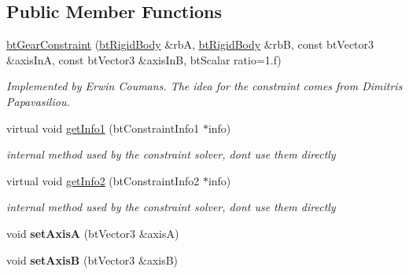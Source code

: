 \subsection*{Public Member Functions}
\begin{DoxyCompactItemize}
\item 
\mbox{\label{classbtGearConstraint_aee33fd1dac22b6f0323757057204e891}} 
\hyperlink{classbtGearConstraint_aee33fd1dac22b6f0323757057204e891}{bt\+Gear\+Constraint} (\hyperlink{classbtRigidBody}{bt\+Rigid\+Body} \&rbA, \hyperlink{classbtRigidBody}{bt\+Rigid\+Body} \&rbB, const bt\+Vector3 \&axis\+InA, const bt\+Vector3 \&axis\+InB, bt\+Scalar ratio=1.f)
\begin{DoxyCompactList}\small\item\em Implemented by Erwin Coumans. The idea for the constraint comes from Dimitris Papavasiliou. \end{DoxyCompactList}\item 
\mbox{\label{classbtGearConstraint_ae8e7d953740bff99eca4441b5d9c7eb1}} 
virtual void \hyperlink{classbtGearConstraint_ae8e7d953740bff99eca4441b5d9c7eb1}{get\+Info1} (bt\+Constraint\+Info1 $\ast$info)
\begin{DoxyCompactList}\small\item\em internal method used by the constraint solver, don\textquotesingle{}t use them directly \end{DoxyCompactList}\item 
\mbox{\label{classbtGearConstraint_ae1c6770b8835458389ca7ae3ce7dfb05}} 
virtual void \hyperlink{classbtGearConstraint_ae1c6770b8835458389ca7ae3ce7dfb05}{get\+Info2} (bt\+Constraint\+Info2 $\ast$info)
\begin{DoxyCompactList}\small\item\em internal method used by the constraint solver, don\textquotesingle{}t use them directly \end{DoxyCompactList}\item 
\mbox{\label{classbtGearConstraint_a7eb82d1854a2ab8982d65af6d2bde007}} 
void {\bfseries set\+AxisA} (bt\+Vector3 \&axisA)
\item 
\mbox{\label{classbtGearConstraint_a846bd7962b466bf4a2796811d7fee1d8}} 
void {\bfseries set\+AxisB} (bt\+Vector3 \&axisB)

\end{DoxyCompactItemize}
